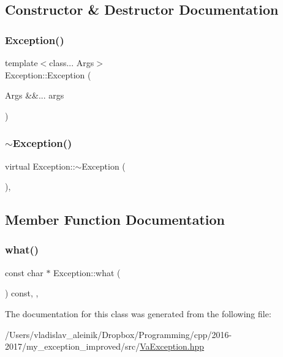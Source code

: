 \subsection{Constructor \& Destructor Documentation}
\mbox{\label{class_exception_a189e31fab4de04b25de0db5a09aa42b4}} 
\subsubsection{\texorpdfstring{Exception()}{Exception()}}
{\footnotesize\ttfamily template$<$class... Args$>$ \\
Exception\+::\+Exception (\begin{DoxyParamCaption}\item[{Args \&\&...}]{args }\end{DoxyParamCaption})\hspace{0.3cm}{\ttfamily [noexcept]}}

\mbox{\label{class_exception_a5c134c74b84c0a7a4c106ac60cabe10c}} 
\subsubsection{\texorpdfstring{$\sim$\+Exception()}{~Exception()}}
{\footnotesize\ttfamily virtual Exception\+::$\sim$\+Exception (\begin{DoxyParamCaption}{ }\end{DoxyParamCaption})\hspace{0.3cm}{\ttfamily [virtual]}, {\ttfamily [default]}}



\subsection{Member Function Documentation}
\mbox{\label{class_exception_a91eace2bc486fa18d3f913a28f3921f8}} 
\subsubsection{\texorpdfstring{what()}{what()}}
{\footnotesize\ttfamily const char $\ast$ Exception\+::what (\begin{DoxyParamCaption}{ }\end{DoxyParamCaption}) const\hspace{0.3cm}{\ttfamily [override]}, {\ttfamily [virtual]}, {\ttfamily [noexcept]}}



The documentation for this class was generated from the following file\+:\begin{DoxyCompactItemize}
\item 
/\+Users/vladislav\+\_\+aleinik/\+Dropbox/\+Programming/cpp/2016-\/2017/my\+\_\+exception\+\_\+improved/src/\hyperlink{_va_exception_8hpp}{Va\+Exception.\+hpp}\end{DoxyCompactItemize}
